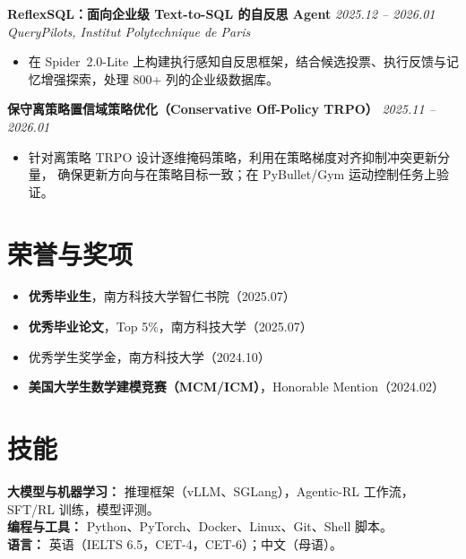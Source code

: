 \documentclass[10pt, a4paper]{article}
\begin{document}
\noindent\textbf{ReflexSQL：面向企业级 Text-to-SQL 的自反思 Agent} \hfill \textit{2025.12 -- 2026.01}\\
\textit{QueryPilots, Institut Polytechnique de Paris} 
\begin{itemize}
  \item 在 Spider~2.0-Lite 上构建执行感知自反思框架，结合候选投票、执行反馈与记忆增强探索，处理 800+ 列的企业级数据库。
\end{itemize}

\vspace{4pt}
\noindent\textbf{保守离策略置信域策略优化（Conservative Off-Policy TRPO）} \hfill \textit{2025.11 -- 2026.01}
\begin{itemize}
  \item 针对离策略 TRPO 设计逐维掩码策略，利用在策略梯度对齐抑制冲突更新分量，
        确保更新方向与在策略目标一致；在 PyBullet/Gym 运动控制任务上验证。
\end{itemize}

\section{荣誉与奖项}

\begin{itemize}[itemsep=0pt, topsep=1pt]
  \item \textbf{优秀毕业生}，南方科技大学智仁书院（2025.07）
  \item \textbf{优秀毕业论文}，Top 5\%，南方科技大学（2025.07）
  \item 优秀学生奖学金，南方科技大学（2024.10）
  \item \textbf{美国大学生数学建模竞赛（MCM/ICM）}，Honorable Mention（2024.02）
\end{itemize}

\section{技能}

\noindent\textbf{大模型与机器学习：} 推理框架（vLLM、SGLang），Agentic-RL 工作流，SFT/RL 训练，模型评测。\\[3pt]
\noindent\textbf{编程与工具：} Python、PyTorch、Docker、Linux、Git、Shell 脚本。\\[3pt]
\noindent\textbf{语言：} 英语（IELTS 6.5，CET-4，CET-6）；中文（母语）。
\end{document}
